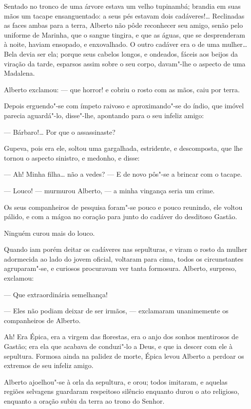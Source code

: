 Sentado no tronco de uma árvore estava um velho tupinambá; brandia em
suas mãos um tacape ensanguentado: a seus pés estavam dois cadáveres!\ldots{}
Reclinadas as faces ambas para a terra, Alberto não pôde reconhecer seu
amigo, senão pelo uniforme de Marinha, que o sangue tingira, e que as
águas, que se desprenderam à noite, haviam ensopado, e enxovalhado. O
outro cadáver era o de uma mulher\ldots{} Bela devia ser ela; porque seus
cabelos longos, e ondeados, fáceis aos beijos da viração da tarde,
esparsos assim sobre o seu corpo, davam"-lhe o aspecto de uma Madalena.

Alberto exclamou: --- que horror! e cobriu o rosto com as mãos, caiu por
terra.

Depois erguendo"-se com ímpeto raivoso e aproximando"-se do índio, que
imóvel parecia aguardá"-lo, disse"-lhe, apontando para o seu infeliz
amigo:

--- Bárbaro!\ldots{} Por que o assassinaste?

Gupeva, pois era ele, soltou uma gargalhada, estridente, e descomposta,
que lhe tornou o aspecto sinistro, e medonho, e disse:

--- Ah! Minha filha\ldots{} não a vedes? --- E de novo pôs"-se a brincar com o
tacape.

--- Louco! --- murmurou Alberto, --- a minha vingança seria um crime.

Os seus companheiros de pesquisa foram"-se pouco e pouco reunindo, ele
voltou pálido, e com a mágoa no coração para junto do cadáver do
desditoso Gastão.

Ninguém curou mais do louco.

Quando iam porém deitar os cadáveres nas sepulturas, e viram o rosto da
mulher adormecida ao lado do jovem oficial, voltaram para cima, todos os
circunstantes agruparam"-se, e curiosos procuravam ver tanta formosura.
Alberto, surpreso, exclamou:

--- Que extraordinária semelhança!

--- Eles não podiam deixar de ser irmãos, --- exclamaram unanimemente os
companheiros de Alberto.

Ah! Era Épica, era a virgem das florestas, era o anjo dos sonhos
mentirosos de Gastão; era ela que acabava de conduzi"-lo a Deus, e que ia
descer com ele à sepultura. Formosa ainda na palidez de morte, Épica
levou Alberto a perdoar os extremos de seu infeliz amigo.

Alberto ajoelhou"-se à orla da sepultura, e orou; todos imitaram, e
aquelas regiões selvagens guardaram respeitoso silêncio enquanto durou o
ato religioso, enquanto a oração subiu da terra ao trono do Senhor.

